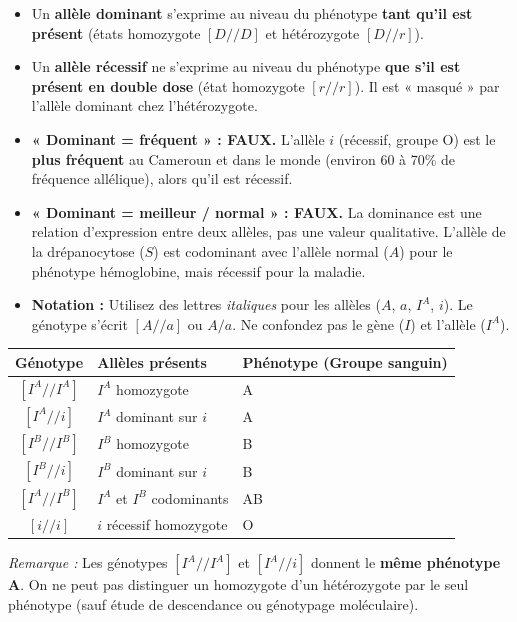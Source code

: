 \documentclass[11pt]{article}
\begin{document}
\begin{propriete}
\begin{itemize}
    \item Un \textbf{allèle dominant} s'exprime au niveau du phénotype \textbf{tant qu'il est présent} (états homozygote $[D//D]$ et hétérozygote $[D//r]$).
    \item Un \textbf{allèle récessif} ne s'exprime au niveau du phénotype \textbf{que s'il est présent en double dose} (état homozygote $[r//r]$). Il est « masqué » par l'allèle dominant chez l'hétérozygote.
\end{itemize}
\end{propriete}

\begin{attention}
\begin{itemize}
    \item \textbf{« Dominant = fréquent » : FAUX.} L'allèle $i$ (récessif, groupe O) est le \textbf{plus fréquent} au Cameroun et dans le monde (environ 60 à 70\% de fréquence allélique), alors qu'il est récessif.
    \item \textbf{« Dominant = meilleur / normal » : FAUX.} La dominance est une relation d'expression entre deux allèles, pas une valeur qualitative. L'allèle de la drépanocytose ($S$) est codominant avec l'allèle normal ($A$) pour le phénotype hémoglobine, mais récessif pour la maladie.
    \item \textbf{Notation :} Utilisez des lettres \emph{italiques} pour les allèles ($A$, $a$, $I^A$, $i$). Le génotype s'écrit $[A//a]$ ou $A/a$. Ne confondez pas le gène ($I$) et l'allèle ($I^A$).
\end{itemize}
\end{attention}

\begin{exemplebox}
\begin{center}
\begin{tabularx}{\linewidth}{|c|X|X|}\hline
\textbf{Génotype} & \textbf{Allèles présents} & \textbf{Phénotype (Groupe sanguin)} \\ \hline
$[I^A//I^A]$ & $I^A$ homozygote & A \\ \hline
$[I^A//i]$ & $I^A$ dominant sur $i$ & A \\ \hline
$[I^B//I^B]$ & $I^B$ homozygote & B \\ \hline
$[I^B//i]$ & $I^B$ dominant sur $i$ & B \\ \hline
$[I^A//I^B]$ & $I^A$ et $I^B$ codominants & AB \\ \hline
$[i//i]$ & $i$ récessif homozygote & O \\ \hline
\end{tabularx}
\end{center}
\emph{Remarque :} Les génotypes $[I^A//I^A]$ et $[I^A//i]$ donnent le \textbf{même phénotype A}. On ne peut pas distinguer un homozygote d'un hétérozygote par le seul phénotype (sauf étude de descendance ou génotypage moléculaire).
\end{exemplebox}
\end{document}
